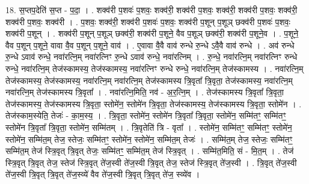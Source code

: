 \documentclass[17pt]{extarticle}
\begin{document}
18. स॒प्तप॒देति॑ स॒प्त - प॒दा॒ । . शक्व॑री प॒शवः॑ प॒शवः॒ शक्व॑री॒ शक्व॑री प॒शवः॒ शक्व॑री॒ शक्व॑री प॒शवः॒ शक्व॑री॒ शक्व॑री प॒शवः॒ शक्व॑री । . प॒शवः॒ शक्व॑री॒ शक्व॑री प॒शवः॑ प॒शवः॒ शक्व॑री प॒शून् प॒शूञ् छक्व॑री प॒शवः॑ प॒शवः॒ शक्व॑री प॒शून् । . शक्व॑री प॒शून् प॒शूञ् छक्व॑री॒ शक्व॑री प॒शूने॒ वैव प॒शूञ् छक्व॑री॒ शक्व॑री प॒शूने॒व । . प॒शूने॒ वैव प॒शून् प॒शूने॒ वावा वै॒व प॒शून् प॒शूने॒ वाव॑ । . ए॒वावा वै॒वै वाव॑ रुन्धे रु॒न्धे ऽवै॒वै वाव॑ रुन्धे । . अव॑ रुन्धे रु॒न्धे ऽवाव॑ रुन्धे॒ नवा॑रत्नि॒म् नवा॑रत्निꣳ रु॒न्धे ऽवाव॑ रुन्धे॒ नवा॑रत्निम् । . रु॒न्धे॒ नवा॑रत्नि॒म् नवा॑रत्निꣳ रुन्धे रुन्धे॒ नवा॑रत्नि॒म् तेज॑स्कामस्य॒ तेज॑स्कामस्य॒ नवा॑रत्निꣳ रुन्धे रुन्धे॒ नवा॑रत्नि॒म् तेज॑स्कामस्य । . नवा॑रत्नि॒म् तेज॑स्कामस्य॒ तेज॑स्कामस्य॒ नवा॑रत्नि॒म् नवा॑रत्नि॒म् तेज॑स्कामस्य त्रि॒वृता᳚ त्रि॒वृता॒ तेज॑स्कामस्य॒ नवा॑रत्नि॒म् नवा॑रत्नि॒म् तेज॑स्कामस्य त्रि॒वृता᳚ । . नवा॑रत्नि॒मिति॒ नव॑ - अ॒र॒त्नि॒म् । . तेज॑स्कामस्य त्रि॒वृता᳚ त्रि॒वृता॒ तेज॑स्कामस्य॒ तेज॑स्कामस्य त्रि॒वृता॒ स्तोमे॑न॒ स्तोमे॑न त्रि॒वृता॒ तेज॑स्कामस्य॒ तेज॑स्कामस्य त्रि॒वृता॒ स्तोमे॑न । . तेज॑स्काम॒स्येति॒ तेजः॑ - का॒म॒स्य॒ । . त्रि॒वृता॒ स्तोमे॑न॒ स्तोमे॑न त्रि॒वृता᳚ त्रि॒वृता॒ स्तोमे॑न॒ सम्मि॑तꣳ॒॒ सम्मि॑तꣳ॒॒ स्तोमे॑न त्रि॒वृता᳚ त्रि॒वृता॒ स्तोमे॑न॒ सम्मि॑तम् । . त्रि॒वृतेति॑ त्रि - वृता᳚ । . स्तोमे॑न॒ सम्मि॑तꣳ॒॒ सम्मि॑तꣳ॒॒ स्तोमे॑न॒ स्तोमे॑न॒ सम्मि॑त॒म् तेज॒ स्तेजः॒ सम्मि॑तꣳ॒॒ स्तोमे॑न॒ स्तोमे॑न॒ सम्मि॑त॒म् तेजः॑ । . सम्मि॑त॒म् तेज॒ स्तेजः॒ सम्मि॑तꣳ॒॒ सम्मि॑त॒म् तेज॑ स्त्रि॒वृत् त्रि॒वृत् तेजः॒ सम्मि॑तꣳ॒॒ सम्मि॑त॒म् तेज॑ स्त्रि॒वृत् । . सम्मि॑त॒मिति॒ सं - मि॒त॒म् । . तेज॑ स्त्रि॒वृत् त्रि॒वृत् तेज॒ स्तेज॑ स्त्रि॒वृत् ते॑ज॒स्वी ते॑ज॒स्वी त्रि॒वृत् तेज॒ स्तेज॑ स्त्रि॒वृत् ते॑ज॒स्वी । . त्रि॒वृत् ते॑ज॒स्वी ते॑ज॒स्वी त्रि॒वृत् त्रि॒वृत् ते॑ज॒स्व्ये॑ वैव ते॑ज॒स्वी त्रि॒वृत् त्रि॒वृत् ते॑ज॒ स्व्ये॑व । \newline
\end{document}
